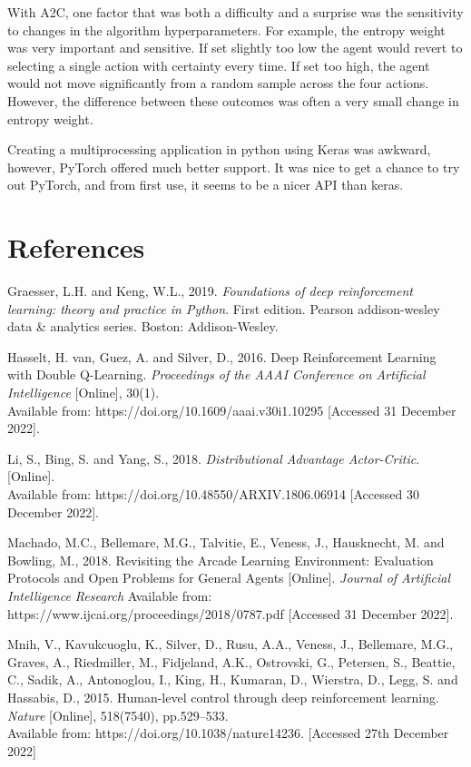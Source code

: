 \documentclass{article}
\begin{document}
With A2C, one factor that was both a difficulty and a surprise was the sensitivity to changes in the algorithm hyperparameters. For example, the entropy weight was very important and sensitive. If set slightly too low the agent would revert to selecting a single action with certainty every time. If set too high, the agent would not move significantly from a random sample across the four actions. However, the difference between these outcomes was often a very small change in entropy weight.

Creating a multiprocessing application in python using Keras was awkward, however, PyTorch offered much better support. It was nice to get a chance to try out PyTorch, and from first use, it seems to be a nicer API than keras.

\section*{References}

\small 

Graesser, L.H. and Keng, W.L., 2019. \emph{Foundations of deep reinforcement learning: theory and practice in Python}. First edition. Pearson addison-wesley data \& analytics series. Boston: Addison-Wesley.

Hasselt, H. van, Guez, A. and Silver, D., 2016. Deep Reinforcement Learning with Double Q-Learning. \emph{Proceedings of the AAAI Conference on Artificial Intelligence} [Online], 30(1). \\
Available from: https://doi.org/10.1609/aaai.v30i1.10295 [Accessed 31 December 2022].

Li, S., Bing, S. and Yang, S., 2018. \emph{Distributional Advantage Actor-Critic}. [Online]. \\
Available from: https://doi.org/10.48550/ARXIV.1806.06914 [Accessed 30 December 2022].

Machado, M.C., Bellemare, M.G., Talvitie, E., Veness, J., Hausknecht, M. and Bowling, M., 2018. Revisiting the Arcade Learning Environment: Evaluation Protocols and Open Problems for General Agents [Online]. \emph{Journal of Artificial Intelligence Research}  Available from: https://www.ijcai.org/proceedings/2018/0787.pdf  [Accessed 31 December 2022].

Mnih, V., Kavukcuoglu, K., Silver, D., Rusu, A.A., Veness, J., Bellemare, M.G., Graves, A., Riedmiller, M., Fidjeland, A.K., Ostrovski, G., Petersen, S., Beattie, C., Sadik, A., Antonoglou, I., King, H., Kumaran, D., Wierstra, D., Legg, S. and Hassabis, D., 2015. Human-level control through deep reinforcement learning. \emph{Nature} [Online], 518(7540), pp.529–533. \\
Available from: https://doi.org/10.1038/nature14236. [Accessed 27th December 2022]
\end{document}
